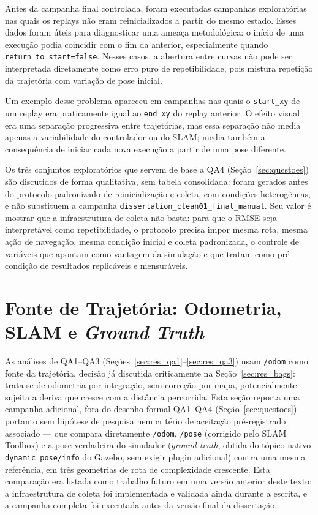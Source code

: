 Antes da campanha final controlada, foram executadas campanhas exploratórias nas
quais os replays não eram reinicializados a partir do mesmo estado. Esses dados
foram úteis para diagnosticar uma ameaça metodológica: o início de uma execução
podia coincidir com o fim da anterior, especialmente quando
\texttt{return\_\allowbreak to\_\allowbreak start=false}. Nesses casos, a abertura
entre curvas não pode ser interpretada diretamente como erro puro de
repetibilidade, pois mistura repetição da trajetória com variação de pose inicial.

Um exemplo desse problema apareceu em campanhas nas quais o \texttt{start\_\allowbreak xy}
de um replay era praticamente igual ao \texttt{end\_\allowbreak xy} do replay
anterior. O efeito visual era uma separação progressiva entre trajetórias, mas
essa separação não media apenas a variabilidade do controlador ou do SLAM; media
também a consequência de iniciar cada nova execução a partir de uma pose diferente.

Os três conjuntos exploratórios que servem de base a QA4
(Seção~\ref{sec:questoes}) são discutidos de forma qualitativa, sem tabela
consolidada: foram gerados antes do protocolo padronizado de reinicialização e
coleta, com condições heterogêneas, e não substituem a campanha
\texttt{dissertation\_\allowbreak clean01\_\allowbreak final\_\allowbreak manual}. Seu valor é
mostrar que a infraestrutura de coleta não basta: para que o RMSE seja
interpretável como repetibilidade, o protocolo precisa impor mesma rota, mesma
ação de navegação, mesma condição inicial e coleta padronizada, o controle de
variáveis que  apontam como vantagem da simulação e que
 tratam como pré-condição de resultados replicáveis
e mensuráveis.

\section{Fonte de Trajetória: Odometria, SLAM e \textit{Ground Truth}}
\label{sec:res_fonte_trajetoria}

As análises de QA1--QA3 (Seções~\ref{sec:res_qa1}--\ref{sec:res_qa3}) usam
\texttt{/\allowbreak odom} como fonte da trajetória, decisão já discutida
criticamente na Seção~\ref{sec:res_bags}: trata-se de odometria por
integração, sem correção por mapa, potencialmente sujeita a deriva que
cresce com a distância percorrida. Esta seção reporta uma campanha adicional,
fora do desenho formal QA1--QA4 (Seção~\ref{sec:questoes}) --- portanto sem
hipótese de pesquisa nem critério de aceitação pré-registrado associado ---
que compara diretamente \texttt{/\allowbreak odom}, \texttt{/\allowbreak pose}
(corrigido pelo SLAM Toolbox) e a pose verdadeira do simulador
(\textit{ground truth}, obtida do tópico nativo
\texttt{dynamic\_\allowbreak pose/info} do Gazebo, sem exigir plugin
adicional) contra uma mesma referência, em três geometrias de rota de
complexidade crescente. Esta comparação era listada como trabalho futuro
em uma versão anterior deste texto; a infraestrutura de coleta foi
implementada e validada ainda durante a escrita, e a campanha completa foi
executada antes da versão final da dissertação.

